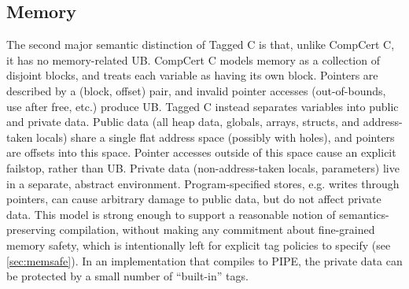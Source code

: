 \documentclass{llncs}
\begin{document}
\subsection{Memory} The second major semantic distinction of Tagged C is that, unlike CompCert C,
it has no memory-related UB. CompCert C models memory as a collection of disjoint blocks,
and treats each variable as having its own block. Pointers are described by a (block, offset) pair,
and invalid pointer accesses (out-of-bounds, use after free, etc.) produce UB.
Tagged C instead separates variables
into public and private data. Public data (all heap data, globals, arrays, structs, and
address-taken locals) share a single flat address space (possibly with holes), and pointers are
offsets into this space. Pointer accesses outside of this space cause
an explicit failstop, rather than UB. 
Private data (non-address-taken locals, parameters) live in a separate, abstract environment.
Program-specified stores, e.g. writes through pointers, can cause arbitrary damage to public
data, but do not affect private data. 
This model is strong enough to support a reasonable
notion of semantics-preserving compilation, without making any commitment about fine-grained
memory safety, which is intentionally left for explicit tag policies to specify (see \cref{sec:memsafe}).
In an implementation that compiles to PIPE, the private data can be protected by a small number of
``built-in'' tags.



\end{document}
